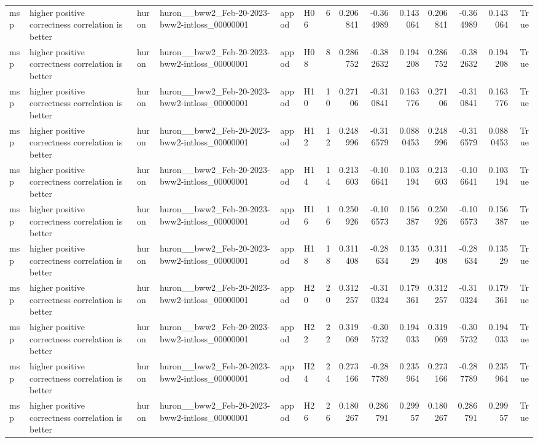 \begin{longtable}{llllllrrrrrrrr}
msp & higher positive correctness correlation is better & huron & huron\_\_bww2\_Feb-20-2023-bww2-intloss\_00000001 & appod & H06 & 6 & 0.206841 & -0.364989 & 0.143064 & 0.206841 & -0.364989 & 0.143064 & True \\
msp & higher positive correctness correlation is better & huron & huron\_\_bww2\_Feb-20-2023-bww2-intloss\_00000001 & appod & H08 & 8 & 0.286752 & -0.382632 & 0.194208 & 0.286752 & -0.382632 & 0.194208 & True \\
msp & higher positive correctness correlation is better & huron & huron\_\_bww2\_Feb-20-2023-bww2-intloss\_00000001 & appod & H10 & 10 & 0.27106 & -0.310841 & 0.163776 & 0.27106 & -0.310841 & 0.163776 & True \\
msp & higher positive correctness correlation is better & huron & huron\_\_bww2\_Feb-20-2023-bww2-intloss\_00000001 & appod & H12 & 12 & 0.248996 & -0.316579 & 0.0880453 & 0.248996 & -0.316579 & 0.0880453 & True \\
msp & higher positive correctness correlation is better & huron & huron\_\_bww2\_Feb-20-2023-bww2-intloss\_00000001 & appod & H14 & 14 & 0.213603 & -0.106641 & 0.103194 & 0.213603 & -0.106641 & 0.103194 & True \\
msp & higher positive correctness correlation is better & huron & huron\_\_bww2\_Feb-20-2023-bww2-intloss\_00000001 & appod & H16 & 16 & 0.250926 & -0.106573 & 0.156387 & 0.250926 & -0.106573 & 0.156387 & True \\
msp & higher positive correctness correlation is better & huron & huron\_\_bww2\_Feb-20-2023-bww2-intloss\_00000001 & appod & H18 & 18 & 0.311408 & -0.28634 & 0.13529 & 0.311408 & -0.28634 & 0.13529 & True \\
msp & higher positive correctness correlation is better & huron & huron\_\_bww2\_Feb-20-2023-bww2-intloss\_00000001 & appod & H20 & 20 & 0.312257 & -0.310324 & 0.179361 & 0.312257 & -0.310324 & 0.179361 & True \\
msp & higher positive correctness correlation is better & huron & huron\_\_bww2\_Feb-20-2023-bww2-intloss\_00000001 & appod & H22 & 22 & 0.319069 & -0.305732 & 0.194033 & 0.319069 & -0.305732 & 0.194033 & True \\
msp & higher positive correctness correlation is better & huron & huron\_\_bww2\_Feb-20-2023-bww2-intloss\_00000001 & appod & H24 & 24 & 0.273166 & -0.287789 & 0.235964 & 0.273166 & -0.287789 & 0.235964 & True \\
msp & higher positive correctness correlation is better & huron & huron\_\_bww2\_Feb-20-2023-bww2-intloss\_00000001 & appod & H26 & 26 & 0.180267 & 0.286791 & 0.29957 & 0.180267 & 0.286791 & 0.29957 & True \\

\end{longtable}
